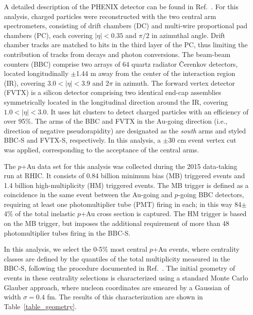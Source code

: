 \documentclass[%
reprint,
showpacs,preprintnumbers,
 amsmath,amssymb,
 aps,
]{revtex4-1}
\newcommand{\pau}{\mbox{$p$+Au}\xspace}
\newcommand{\bbceta}{\mbox{$3.0<|\eta|<3.9$}\xspace}
\begin{document}
A detailed description of the PHENIX detector can be found in Ref.~\cite{Adcox2003469}. For this analysis, charged particles were reconstructed with the two central arm spectrometers, consisting of drift chambers (DC) and multi-wire proportional pad chambers (PC), each covering $|\eta|<0.35$ and $\pi/2$ in azimuthal angle. Drift chamber tracks are matched to hits in the third layer of the PC, thus limiting the contribution of tracks from decays and photon conversions. The beam-beam counters (BBC) comprise two arrays of 64 quartz radiator \v{C}erenkov detectors, located longitudinally $\pm$1.44 m away from the center of the interaction region (IR), covering \bbceta and 2$\pi$ in azimuth. The forward vertex detector (FVTX) is a silicon detector comprising two identical end-cap assemblies symmetrically located in the longitudinal direction around the IR, covering $1.0 < |\eta| < 3.0$. It uses hit clusters to detect charged particles with an efficiency of over 95\%.
The arms of the BBC and FVTX in the Au-going direction (i.e., direction of negative pseudorapidity) are designated as the \emph{south} arms and styled BBC-S and FVTX-S, respectively. In this analysis, a $\pm$30 cm event vertex cut was applied, corresponding to the acceptance of the central arms. 

The \pau data set for this analysis was collected during the 2015 data-taking run at RHIC. It consists of 0.84 billion minimum bias (MB) triggered events and 1.4 billion high-multiplicity (HM) triggered events. The MB trigger is defined as a coincidence in the same event between the Au-going and $p$-going BBC detectors, requiring at least one photomultiplier tube (PMT) firing in each; in this way 84$\pm$4\% of the total inelastic \pau cross section is captured. The HM trigger is based on the MB trigger, but imposes the additional requirement of more than 48 photomultiplier tubes firing in the BBC-S. 

In this analysis, we select the 0-5\% most central \pau events, where 
centrality classes are defined by the quantiles of the total multiplicity measured in the BBC-S, following the procedure documented in Ref.~\cite{bbc}.
The initial geometry of events in these centrality selections is characterized using a standard Monte Carlo Glauber approach, where nucleon coordinates are smeared by a Gaussian of width $\sigma = 0.4$ fm. The results of this characterization are shown in Table~\ref{table_geometry}.
\end{document}
